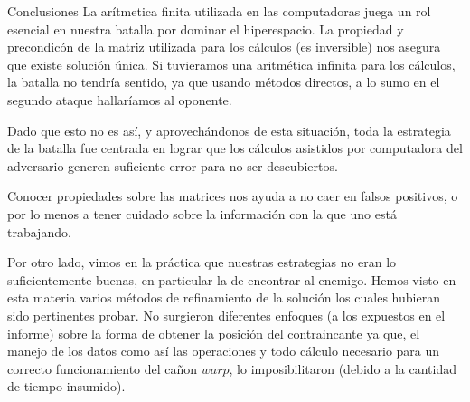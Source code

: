 \begin{section}{Conclusiones}
	La arítmetica finita utilizada en las computadoras juega un rol esencial en nuestra batalla por dominar el hiperespacio. La propiedad y precondicón de la matriz utilizada para los cálculos (es inversible) nos asegura que existe solución única. Si tuvieramos una aritmética infinita para los cálculos, la batalla no tendría sentido, ya que usando métodos directos, a lo sumo en el segundo ataque hallaríamos al oponente.
	 
	Dado que esto no es así, y aprovechándonos de esta situación, toda la estrategia de la batalla fue centrada en lograr que los cálculos asistidos por computadora del adversario generen suficiente error para no ser descubiertos.
	
	Conocer propiedades sobre las matrices nos ayuda a no caer en falsos positivos, o por lo menos a tener cuidado sobre la información con la que uno está trabajando.
	
	Por otro lado, vimos en la práctica que nuestras estrategias no eran lo suficientemente buenas, en particular la de encontrar al enemigo. Hemos visto en esta materia varios métodos de refinamiento de la solución los cuales hubieran sido pertinentes probar. No surgieron diferentes enfoques (a los expuestos en el informe) sobre la forma de obtener la posición del contraincante ya que, el manejo de los datos como así las operaciones y todo cálculo necesario para un correcto funcionamiento del cañon $warp$, lo imposibilitaron (debido a la cantidad de tiempo insumido).
\end{section}
